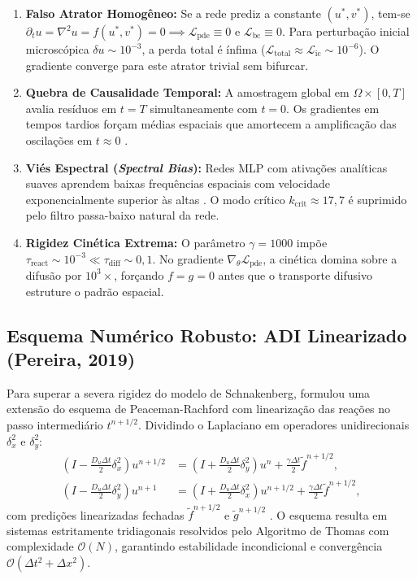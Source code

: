 \documentclass[a4paper, 12pt, twoside]{article}
\begin{document}
\begin{enumerate}[leftmargin=1.1em, itemsep=0.5pt]
  \item \textbf{Falso Atrator Homogêneo:} Se a rede prediz a constante $(u^*, v^*)$, tem-se
  $\partial_t u = \nabla^2 u = f(u^*, v^*) = 0 \implies \mathcal{L}_{\mathrm{pde}} \equiv 0$ e
  $\mathcal{L}_{\mathrm{bc}} \equiv 0$. Para perturbação inicial microscópica
  $\delta u \sim 10^{-3}$, a perda total é ínfima ($\mathcal{L}_{\mathrm{total}} \approx \mathcal{L}_{\mathrm{ic}} \sim 10^{-6}$). O gradiente converge para este atrator trivial sem bifurcar.

  \item \textbf{Quebra de Causalidade Temporal:} A amostragem global em $\Omega \times [0,T]$
  avalia resíduos em $t = T$ simultaneamente com $t = 0$. Os gradientes em tempos tardios
  forçam médias espaciais que amortecem a amplificação das oscilações em $t \approx 0$ \cite{wang2022causality}.

  \item \textbf{Viés Espectral (\textit{Spectral Bias}):} Redes MLP com ativações analíticas suaves
  aprendem baixas frequências espaciais com velocidade exponencialmente superior às altas \cite{rahaman2019spectral}. O modo crítico $k_{\mathrm{crit}} \approx 17{,}7$ é suprimido pelo filtro passa-baixo natural da rede.

  \item \textbf{Rigidez Cinética Extrema:} O parâmetro $\gamma = 1000$ impõe
  $\tau_{\mathrm{react}} \sim 10^{-3} \ll \tau_{\mathrm{diff}} \sim 0{,}1$. No gradiente
  $\nabla_\theta \mathcal{L}_{\mathrm{pde}}$, a cinética domina sobre a difusão por $10^3 \times$,
  forçando $f=g=0$ antes que o transporte difusivo estruture o padrão espacial.
\end{enumerate}

\subsection{Esquema Numérico Robusto: ADI Linearizado (Pereira, 2019)}

Para superar a severa rigidez do modelo de Schnakenberg, \textcite{pereira2019} formulou
uma extensão do esquema de Peaceman-Rachford com linearização das reações no passo intermediário $t^{n+1/2}$.
Dividindo o Laplaciano em operadores unidirecionais $\delta_x^2$ e $\delta_y^2$:
\begin{align}
  \left(I - \frac{D_u \Delta t}{2}\delta_x^2\right) u^{n+1/2} &= \left(I + \frac{D_u \Delta t}{2}\delta_y^2\right) u^n + \frac{\gamma \Delta t}{2} \tilde{f}^{n+1/2}, \label{eq:adi_step1}\\[-2pt]
  \left(I - \frac{D_u \Delta t}{2}\delta_y^2\right) u^{n+1}   &= \left(I + \frac{D_u \Delta t}{2}\delta_x^2\right) u^{n+1/2} + \frac{\gamma \Delta t}{2} \tilde{f}^{n+1/2}, \label{eq:adi_step2}
\end{align}
com predições linearizadas fechadas $\tilde{f}^{n+1/2}$ e $\tilde{g}^{n+1/2}$ \cite{pereira2019}.
O esquema resulta em sistemas estritamente tridiagonais resolvidos pelo Algoritmo de Thomas
com complexidade $\mathcal{O}(N)$, garantindo estabilidade incondicional e convergência
$\mathcal{O}(\Delta t^2 + \Delta x^2)$.
\end{document}
